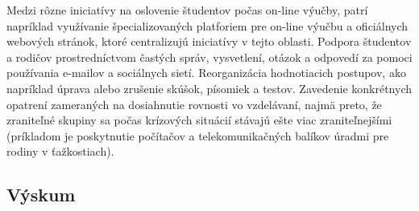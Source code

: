 \documentclass[10pt,oneside,slovak,a4paper]{article}
\begin{document}
Medzi rôzne iniciatívy na oslovenie študentov počas on-line výučby, patrí napríklad využívanie špecializovaných platforiem pre on-line výučbu a oficiálnych webových stránok, ktoré centralizujú iniciatívy v tejto oblasti. Podpora študentov a rodičov prostredníctvom častých správ, vysvetlení, otázok a odpovedí za pomoci používania e-mailov a sociálnych sietí. Reorganizácia hodnotiacich postupov, ako napríklad úprava alebo zrušenie skúšok, písomiek a testov. Zavedenie konkrétnych opatrení zameraných na dosiahnutie rovnosti vo vzdelávaní, najmä preto, že zraniteľné skupiny sa počas krízových situácií stávajú ešte viac zraniteľnejšími (príkladom je poskytnutie počítačov a telekomunikačných balíkov úradmi pre rodiny v ťažkostiach).  %

\subsection{Výskum}%
\end{document}
